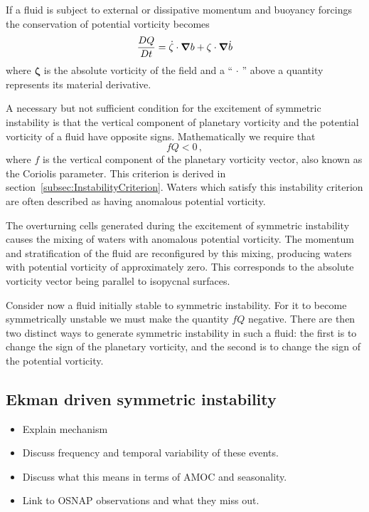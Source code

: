 If a fluid is subject to external or dissipative momentum and buoyancy forcings the conservation of potential vorticity  becomes
\begin{equation}
    \frac{DQ}{Dt} = \dot{\mathbf{\zeta}} \cdot  \grad{b} + \mathbf{\zeta} \cdot \grad{\dot{b}}
\end{equation}
where $\mathbf{\zeta}$ is the absolute vorticity of the field and a ``$\,\cdot{}\,$'' above a quantity represents its material derivative.

A necessary but not sufficient condition for the excitement of symmetric instability is that the vertical component of planetary vorticity and the potential vorticity of a fluid have opposite signs. Mathematically we require that
\begin{equation}
    \label{eq:PVConservation}
    f Q < 0 \, ,
\end{equation}
where $f$ is the vertical component of the planetary vorticity vector, also known as the Coriolis parameter. This criterion is derived in section~\ref{subsec:InstabilityCriterion}. Waters which satisfy this instability criterion are often described as having anomalous potential vorticity.

The overturning cells generated during the excitement of symmetric instability causes the mixing of waters with anomalous potential vorticity. The momentum and stratification of the fluid are reconfigured by this mixing, producing waters with potential  vorticity of approximately zero. This corresponds to the absolute vorticity vector being parallel to isopycnal surfaces.

Consider now a fluid initially stable to symmetric instability. For it to become symmetrically unstable we must make the quantity $fQ$ negative. There are then two distinct ways to generate symmetric instability in such a fluid: the first is to change the sign of the planetary vorticity, and the second is to change the sign of the potential vorticity.

\subsection{Ekman driven symmetric instability}
\begin{itemize}
    \item Explain mechanism
    \item Discuss frequency and temporal variability of these events.
    \item Discuss what this means in terms of AMOC and seasonality.
    \item Link to OSNAP observations and what they miss out.
\end{itemize}

